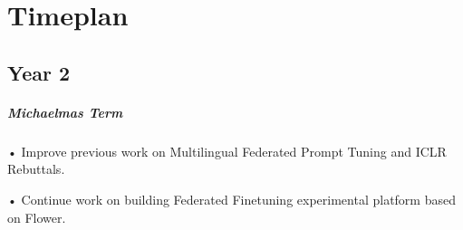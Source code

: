 \documentclass[withindex,glossary,firstyr]{cam-thesis}
\begin{document}









\chapter{Timeplan} \label{Timeplan}

\section{Year 2}
\paragraph{Michaelmas Term} 
• Improve previous work on Multilingual Federated Prompt Tuning and ICLR Rebuttals. 

• Continue work on building Federated Finetuning experimental platform based on Flower. 
\end{document}
